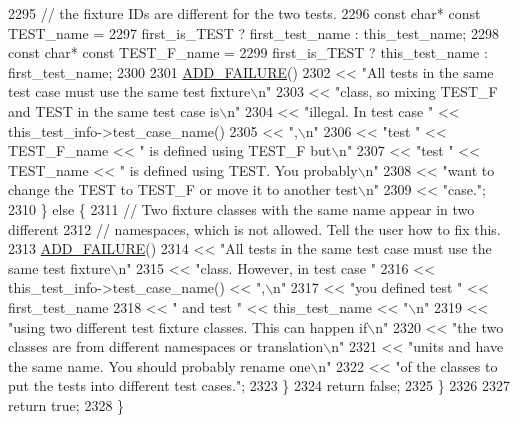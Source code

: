 \begin{DoxyCode}
2295       \textcolor{comment}{// the fixture IDs are different for the two tests.}
2296       \textcolor{keyword}{const} \textcolor{keywordtype}{char}* \textcolor{keyword}{const} TEST\_name =
2297           first\_is\_TEST ? first\_test\_name : this\_test\_name;
2298       \textcolor{keyword}{const} \textcolor{keywordtype}{char}* \textcolor{keyword}{const} TEST\_F\_name =
2299           first\_is\_TEST ? this\_test\_name : first\_test\_name;
2300 
2301       \hyperlink{gtest_8h_adc16b5b0a740c39084ea5c9e960e3063}{ADD\_FAILURE}()
2302           << \textcolor{stringliteral}{"All tests in the same test case must use the same test fixture\(\backslash\)n"}
2303           << \textcolor{stringliteral}{"class, so mixing TEST\_F and TEST in the same test case is\(\backslash\)n"}
2304           << \textcolor{stringliteral}{"illegal.  In test case "} << this\_test\_info->test\_case\_name()
2305           << \textcolor{stringliteral}{",\(\backslash\)n"}
2306           << \textcolor{stringliteral}{"test "} << TEST\_F\_name << \textcolor{stringliteral}{" is defined using TEST\_F but\(\backslash\)n"}
2307           << \textcolor{stringliteral}{"test "} << TEST\_name << \textcolor{stringliteral}{" is defined using TEST.  You probably\(\backslash\)n"}
2308           << \textcolor{stringliteral}{"want to change the TEST to TEST\_F or move it to another test\(\backslash\)n"}
2309           << \textcolor{stringliteral}{"case."};
2310     \} \textcolor{keywordflow}{else} \{
2311       \textcolor{comment}{// Two fixture classes with the same name appear in two different}
2312       \textcolor{comment}{// namespaces, which is not allowed. Tell the user how to fix this.}
2313       \hyperlink{gtest_8h_adc16b5b0a740c39084ea5c9e960e3063}{ADD\_FAILURE}()
2314           << \textcolor{stringliteral}{"All tests in the same test case must use the same test fixture\(\backslash\)n"}
2315           << \textcolor{stringliteral}{"class.  However, in test case "}
2316           << this\_test\_info->test\_case\_name() << \textcolor{stringliteral}{",\(\backslash\)n"}
2317           << \textcolor{stringliteral}{"you defined test "} << first\_test\_name
2318           << \textcolor{stringliteral}{" and test "} << this\_test\_name << \textcolor{stringliteral}{"\(\backslash\)n"}
2319           << \textcolor{stringliteral}{"using two different test fixture classes.  This can happen if\(\backslash\)n"}
2320           << \textcolor{stringliteral}{"the two classes are from different namespaces or translation\(\backslash\)n"}
2321           << \textcolor{stringliteral}{"units and have the same name.  You should probably rename one\(\backslash\)n"}
2322           << \textcolor{stringliteral}{"of the classes to put the tests into different test cases."};
2323     \}
2324     \textcolor{keywordflow}{return} \textcolor{keyword}{false};
2325   \}
2326 
2327   \textcolor{keywordflow}{return} \textcolor{keyword}{true};
2328 \}
\end{DoxyCode}
